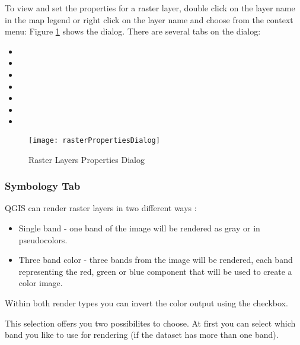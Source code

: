 To view and set the properties for a raster layer, double click 
on the layer name in the map legend or right click on the layer name and choose 
 from the context menu:
Figure \ref{fig:raster_properties} shows the  dialog. 
There are several tabs on the dialog: 

\begin{itemize}
 \item {}
 \item {}
 \item {}
 \item {}
 \item {}
 \item {}
 \item {}
\end{itemize}

\begin{figure}[h]
  \begin{center}
   \caption{Raster Layers Properties Dialog \nixcaption}\label{fig:raster_properties}\smallskip
   \texttt{[image: rasterPropertiesDialog]}
\end{center}  
\end{figure}

\subsubsection{Symbology Tab}\label{label_sombology}

QGIS can render raster layers in two different ways :

\begin{itemize}
\item Single band - one band of the image will be rendered as gray or in 
pseudocolors.
\item Three band color - three bands from the image will be rendered, each 
band representing the red, green or blue component that will be used to create 
a color image.
\end{itemize}

Within both render types you can invert the color output using the 
 checkbox.


This selection offers you two possibilites to choose. At first you can
select which band you like to use for rendering (if the dataset has more than 
one band). 

